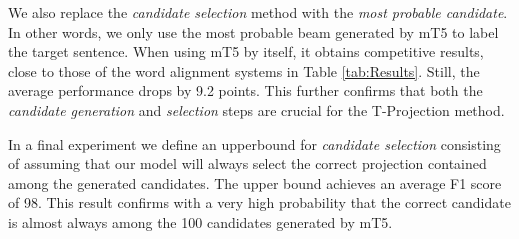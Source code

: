 \documentclass[11pt]{article}
\begin{document}
We also replace the \emph{candidate selection} method with the \emph{most probable
candidate}. In other words, we only use the most probable beam generated by
mT5 to label the target sentence. When using mT5 by itself, it obtains
competitive results, close to those of the word alignment systems in
Table \ref{tab:Results}. Still, the average performance drops by 9.2 points.
This further confirms that both the \emph{candidate generation} and
\emph{selection} steps are crucial for the T-Projection method. 

In a final experiment we define an upperbound for \emph{candidate selection}
consisting of assuming that our model will always select the correct projection
contained among the generated candidates. The upper bound achieves an average F1 score of
98. This result confirms with a very high probability that the correct candidate is almost 
always among the 100 candidates generated by mT5. 

\begin{table*}[htb]
\caption{F1 scores on MasakhaNER2.0 for mDebertaV3 trained with projected annotations from different systems. "+EN" denotes concatenation of the automatically generated target language dataset with the source English dataset.}
\label{tab:MasakhaNER2}
\end{table*}
\end{document}
